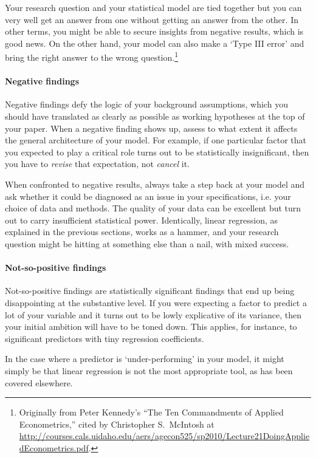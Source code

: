 Your research question and your statistical model are tied together but you can very well get an answer from one without getting an answer from the other. In other terms, you might be able to secure insights from negative results, which is good news. On the other hand, your model can also make a `Type III error' and bring the right answer to the wrong question.\footnote{Originally from Peter Kennedy's ``The Ten Commandments of Applied Econometrics,'' cited by Christopher S.~McIntosh at \url{http://courses.cals.uidaho.edu/aers/agecon525/sp2010/Lecture21DoingAppliedEconometrics.pdf}.}

\paragraph{Negative findings} Negative findings defy the logic of your background assumptions, which you should have translated as clearly as possible as working hypotheses at the top of your paper. When a negative finding shows up, assess to what extent it affects the general architecture of your model. For example, if one particular factor that you expected to play a critical role turns out to be statistically insignificant, then you have to \emph{revise} that expectation, not \emph{cancel} it.

When confronted to negative results, always take a step back at your model and ask whether it could be diagnosed as an issue in your specifications, i.e. your choice of data and methods. The quality of your data can be excellent but turn out to carry insufficient statistical power. Identically, linear regression, as explained in the previous sections, works as a hammer, and your research question might be hitting at something else than a nail, with mixed success.

\paragraph{Not-so-positive findings} Not-so-positive findings are statistically significant findings that end up being disappointing at the substantive level. If you were expecting a factor to predict a lot of your variable and it turns out to be lowly explicative of its variance, then your initial ambition will have to be toned down. This applies, for instance, to significant predictors with tiny regression coefficients.

In the case where a predictor is `under-performing' in your model, it might simply be that linear regression is not the most appropriate tool, as has been covered elsewhere.


